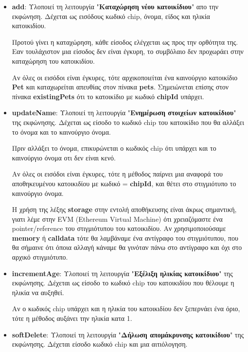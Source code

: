 \documentclass[12pt,a4paper]{article}
\begin{document}
\begin{itemize}
    \item \textbf{add}: Υλοποιεί τη λειτουργία "\textbf{Καταχώρηση νέου κατοικίδιου}" απο την εκφώνηση. Δέχεται ως εισόδους κωδικό chip, όνομα, είδος και ηλικία κατοικιδίου.
    
    Προτού γίνει η καταχώρηση, κάθε είσοδος ελέγχεται ως προς την ορθότητα της. Εαν τουλάχιστον μια είσοδος δεν είναι έγκυρη, το συμβόλαιο δεν προχωράει στην καταχώρηση του κατοικιδίου.

    Αν όλες οι εισόδοι είναι έγκυρες, τότε αρχικοποιείται ένα καινούργιο κατοικίδιο \textbf{Pet} και καταχωρείται απευθίας στον πίνακα \textbf{pets}. Σημειώνεται επίσης στον πίνακα \textbf{existingPets} ότι το κατοικίδιο με κωδικό \textbf{chipId} υπάρχει.

    \item \textbf{updateName}: Υλοποιεί τη λειτουργία "\textbf{Ενημέρωση στοιχείων κατοικίδιου}" της εκφώνησης. Δέχεται ως είσοδο το κωδικό chip του κατοικίδιο που θα αλλάξει το όνομα και το καινούργιο όνομα.
    
    Πριν αλλάξει το όνομα, επικυρώνεται ο κωδικός chip ότι υπάρχει και το καινούργιο όνομα οτι δεν είναι κενό.

    Αν όλες οι εισόδοι είναι έγκυρες, τότε η μέθοδος παίρνει μια αναφορά του αποθηκευμένου κατοικιδίου με κωδικό = \textbf{chipId}, και θέτει στο στιγμιότυπο το καινούργιο όνομα. 
    
    Η χρήση της λέξης \textbf{storage} στην εντολή αποθήκευσης είναι άκρως σημαντική, γιατι λέμε στην EVM (Ethereum Virtual Machine) ότι χρειαζόμαστε ένα pointer/reference του στιγμιότυπου του κατοικιδίου. Αν χρησιμοποιούσαμε \textbf{memory} ή \textbf{calldata} τότε θα λαμβάναμε ένα αντίγραφο του στιγμιότυπου, που θα σήμαινε ότι όποια αλλαγή κάναμε θα γινόταν πάνω στο αντίγραφο και όχι στο αρχικό στιγμιότυπο. 

    \item \textbf{incrementAge}: Υλοποιεί τη λειτουργία "\textbf{Εξέλιξη ηλικίας κατοικίδιου}" της εκφώνησης. Δέχεται ως είσοδο το κωδικό chip του κατοικιδίου που θέλουμε η ηλικία να αυξηθεί.
    
    Αν ο κωδικός chip υπάρχει και η ηλικία του κατοικιδίου δεν ξεπερνάει ένα όριο, τότε η μέθοδος αυξάνει την ηλικία κατα 1.

    \item \textbf{softDelete}: Υλοποιεί τη λειτουργία "\textbf{Δήλωση απομάκρυνσης κατοικίδιου}" της εκφώνησης. Δέχεται είσοδο κωδικό chip και μια αιτιόλογηση.
    

\end{itemize}
\end{document}
